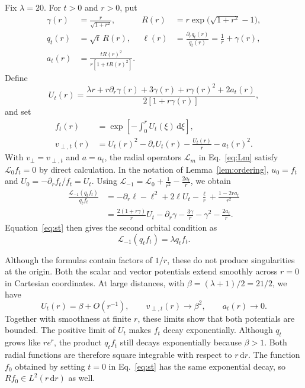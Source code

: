 \documentclass[11pt,a4paper]{article}
\theoremstyle{remark}
\theoremstyle{plain}
\begin{document}
Fix $\lambda=20$. For $t>0$ and $r>0$, put
\begin{equation}
 \begin{aligned}
  \gamma(r)&=\frac r{\sqrt{1+r^2}},&
  R(r)&=r\exp\bigl(\sqrt{1+r^2}-1\bigr),\\
  q_t(r)&=\sqrt t\,R(r),&
  \ell(r)&=\frac{\partial_rq_t(r)}{q_t(r)}=\frac1r+\gamma(r),\\
  a_t(r)&=\frac{tR(r)^2}{r[1+tR(r)^2]}.
 \end{aligned}
 \label{eq:bounded-functions}
\end{equation}
Define
\begin{equation}
 U_t(r)=\frac{\lambda r+r\partial_r\gamma(r)+3\gamma(r)+r\gamma(r)^2+2a_t(r)}
                  {2[1+r\gamma(r)]},
 \label{eq:st}
\end{equation}
and set
\begin{align*}
 f_t(r)&=\exp\left[-\int_0^r U_t(\xi)\,\mathrm{d}\xi\right],\\
 v_{\perp,t}(r)&=U_t(r)^2-\partial_rU_t(r)-\frac{U_t(r)}r-a_t(r)^2.
\end{align*}
With $v_\perp=v_{\perp,t}$ and $a=a_t$, the radial operators
$\mathcal L_m$ in Eq.~\eqref{eq:Lm} satisfy $\mathcal L_0f_t=0$ 
by direct calculation. In the notation of
Lemma~\ref{lem:ordering},
$u_0=f_t$ and $U_0=-\partial_rf_t/f_t=U_t$. Using 
$\mathcal L_{-1} = \mathcal L_0 + \tfrac{1}{r^2} - \tfrac{2a_t}{r}$, 
we obtain
\begin{equation*}
\begin{aligned}
 \frac{\mathcal L_{-1}(q_tf_t)}{q_tf_t}
& =-\partial_r\ell-\ell^2+2\ell U_t-\frac\ell r
                  +\frac{1-2ra_t}{r^2} \\
&=\frac{2(1+r\gamma)}{r}U_t - \partial_r \gamma -\frac{3\gamma}{r} - \gamma^2 - \frac{2a_t}{r}.
\end{aligned}
\end{equation*}
Equation~\eqref{eq:st} then gives 
the second orbital condition as
\begin{equation*}
      \mathcal L_{-1}(q_tf_t) =\lambda q_tf_t.
\end{equation*}


Although the formulas contain factors of $1/r$, these do not produce
singularities at the origin. Both the scalar and vector potentials
extend smoothly across $r=0$ in Cartesian coordinates. At large
distances, with $\beta=(\lambda+1)/2=21/2$, we have
\begin{equation*}
 U_t(r)=\beta+O(r^{-1}),\qquad
 v_{\perp,t}(r)\longrightarrow\beta^2,\qquad a_t(r)\longrightarrow0.
\end{equation*}
Together with smoothness at finite $r$, these limits show that both
potentials are bounded. The positive limit of $U_t$ makes $f_t$ decay
exponentially. Although $q_t$ grows like $re^r$, the product $q_tf_t$
still decays exponentially because $\beta>1$. Both radial functions
are therefore square integrable with respect to $r\,\mathrm{d}r$.
The function $f_0$ obtained by setting $t=0$ in Eq.~\eqref{eq:st}
has the same exponential decay, so $Rf_0\in L^2(r\,\mathrm{d}r)$ as well.
\end{document}
